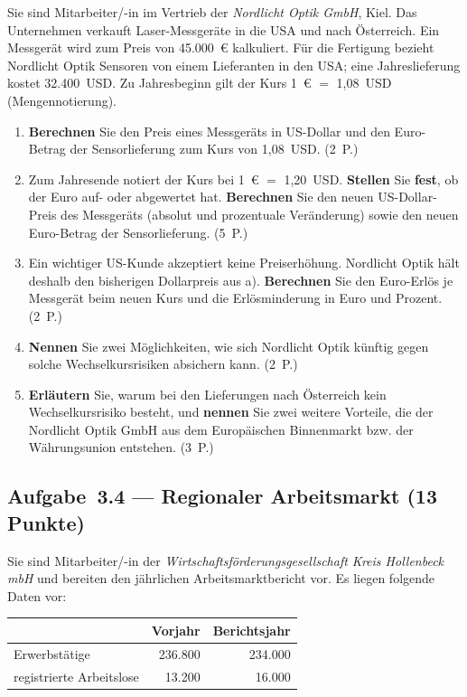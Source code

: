 Sie sind Mitarbeiter/-in im Vertrieb der \emph{Nordlicht Optik GmbH}, Kiel. Das
Unternehmen verkauft Laser-Messgeräte in die USA und nach Österreich. Ein Messgerät wird
zum Preis von 45.000~€ kalkuliert. Für die Fertigung bezieht Nordlicht Optik Sensoren von
einem Lieferanten in den USA; eine Jahreslieferung kostet 32.400~USD. Zu Jahresbeginn gilt der
Kurs 1~€ $=$ 1,08~USD (Mengennotierung).

\begin{enumerate}[label=\alph*)]
  \item \textbf{Berechnen} Sie den Preis eines Messgeräts in US-Dollar und den
    Euro-Betrag der Sensorlieferung zum Kurs von 1,08~USD. \hfill (2~P.)
  \item Zum Jahresende notiert der Kurs bei 1~€ $=$ 1,20~USD. \textbf{Stellen} Sie
    \textbf{fest}, ob der Euro auf- oder abgewertet hat. \textbf{Berechnen} Sie den neuen
    US-Dollar-Preis des Messgeräts (absolut und prozentuale Veränderung) sowie den neuen
    Euro-Betrag der Sensorlieferung. \hfill (5~P.)
  \item Ein wichtiger US-Kunde akzeptiert keine Preiserhöhung. Nordlicht Optik hält
    deshalb den bisherigen Dollarpreis aus a). \textbf{Berechnen} Sie den Euro-Erlös je
    Messgerät beim neuen Kurs und die Erlösminderung in Euro und Prozent. \hfill (2~P.)
  \item \textbf{Nennen} Sie zwei Möglichkeiten, wie sich Nordlicht Optik künftig gegen
    solche Wechselkursrisiken absichern kann. \hfill (2~P.)
  \item \textbf{Erläutern} Sie, warum bei den Lieferungen nach Österreich kein
    Wechselkursrisiko besteht, und \textbf{nennen} Sie zwei weitere Vorteile, die der
    Nordlicht Optik GmbH aus dem Europäischen Binnenmarkt bzw. der Währungsunion
    entstehen. \hfill (3~P.)
\end{enumerate}

\subsection*{Aufgabe~3.4 --- Regionaler Arbeitsmarkt (13 Punkte)}

Sie sind Mitarbeiter/-in der \emph{Wirtschaftsförderungsgesellschaft Kreis Hollenbeck mbH}
und bereiten den jährlichen Arbeitsmarktbericht vor. Es liegen folgende Daten vor:

\begin{center}
\begin{tabular}{lrr}
\toprule
 & \textbf{Vorjahr} & \textbf{Berichtsjahr}\\
\midrule
Erwerbstätige & 236.800 & 234.000\\
registrierte Arbeitslose & 13.200 & 16.000\\
\bottomrule
\end{tabular}
\end{center}

